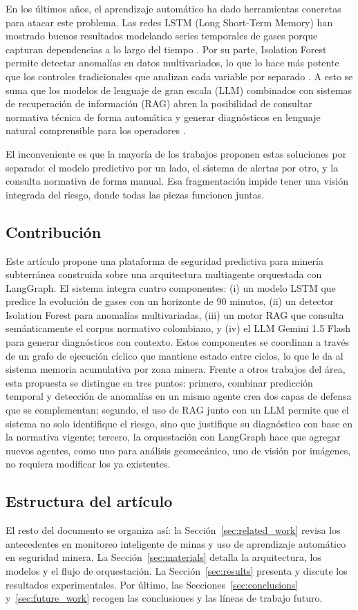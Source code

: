 \documentclass[journal,onecolumn]{IEEEtran}
\begin{document}
En los últimos años, el aprendizaje automático ha dado herramientas concretas para atacar este problema. Las redes LSTM (Long Short-Term Memory) han mostrado buenos resultados modelando series temporales de gases porque capturan dependencias a lo largo del tiempo \cite{hochreiter1997}. Por su parte, Isolation Forest permite detectar anomalías en datos multivariados, lo que lo hace más potente que los controles tradicionales que analizan cada variable por separado \cite{liu2008}. A esto se suma que los modelos de lenguaje de gran escala (LLM) combinados con sistemas de recuperación de información (RAG) abren la posibilidad de consultar normativa técnica de forma automática y generar diagnósticos en lenguaje natural comprensible para los operadores \cite{lewis2020, gemini}.

El inconveniente es que la mayoría de los trabajos proponen estas soluciones por separado: el modelo predictivo por un lado, el sistema de alertas por otro, y la consulta normativa de forma manual. Esa fragmentación impide tener una visión integrada del riesgo, donde todas las piezas funcionen juntas.
\subsection{Contribución}
Este artículo propone una plataforma de seguridad predictiva para minería subterránea construida sobre una arquitectura multiagente orquestada con LangGraph. El sistema integra cuatro componentes: (i) un modelo LSTM que predice la evolución de gases con un horizonte de 90 minutos, (ii) un detector Isolation Forest para anomalías multivariadas, (iii) un motor RAG que consulta semánticamente el corpus normativo colombiano, y (iv) el LLM Gemini 1.5 Flash para generar diagnósticos con contexto. Estos componentes se coordinan a través de un grafo de ejecución cíclico que mantiene estado entre ciclos, lo que le da al sistema memoria acumulativa por zona minera.
Frente a otros trabajos del área, esta propuesta se distingue en tres puntos: primero, combinar predicción temporal y detección de anomalías en un mismo agente crea dos capas de defensa que se complementan; segundo, el uso de RAG junto con un LLM permite que el sistema no solo identifique el riesgo, sino que justifique su diagnóstico con base en la normativa vigente; tercero, la orquestación con LangGraph hace que agregar nuevos agentes, como uno para análisis geomecánico, uno de visión por imágenes, no requiera modificar los ya existentes.
\subsection{Estructura del artículo}
El resto del documento se organiza así: la Sección~\ref{sec:related_work} revisa los antecedentes en monitoreo inteligente de minas y uso de aprendizaje automático en seguridad minera. La Sección~\ref{sec:materials} detalla la arquitectura, los modelos y el flujo de orquestación. La Sección~\ref{sec:results} presenta y discute los resultados experimentales. Por último, las Secciones~\ref{sec:conclusions} y~\ref{sec:future_work} recogen las conclusiones y las líneas de trabajo futuro.
\end{document}
